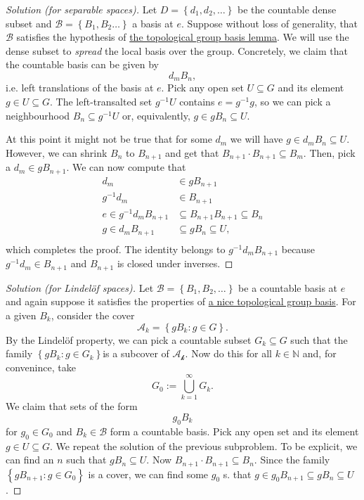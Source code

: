 \begin{proof}[Solution (for separable spaces)]
    Let \( D = \left\{ d_1, d_2, \ldots \right\} \) be the countable dense subset and \( \mathcal{B} = \left\{ B_1, B_2 \ldots \right\} \) a basis at \( e \). Suppose without loss of generality, that \( \mathcal{B} \) satisfies the hypothesis of \hyperlink{TopGroupLocalBasis}{the topological group basis lemma}. We will use the dense subset to \emph{spread} the local basis over the group. Concretely, we claim that the countable basis can be given by
    \[ 
       d_m B_n,
   \]
   i.e. left translations of the basis at \( e \). Pick any open set \( U \subseteq G \) and its element \( g \in U \subseteq G \). The left-transalted set \( g^{-1}U \) contains \( e = g^{-1}g \), so we can pick a neighbourhood \( B_n \subseteq g^{-1}U \) or, equivalently, \( g \in gB_n \subseteq U \).

   At this point it might not be true that for some \( d_m \) we will have \( g \in d_mB_n \subseteq U \). However, we can shrink \( B_n \) to \( B_{n+1} \) and get that \( B_{n+1} \cdot B_{n+1} \subseteq B_m \). Then, pick a \( d_m \in gB_{n+1} \). We can now compute that
\begin{align*}
    d_m &\in gB_{n+1}  \\
    g^{-1}d_m &\in B_{n+1} \\
    e \in g^{-1}d_mB_{n+1} &\subseteq B_{n+1}B_{n+1}\subseteq B_n \\
    g \in d_mB_{n+1} &\subseteq gB_n \subseteq U, \\
\end{align*}
which completes the proof. The identity belongs to \( g^{-1}d_mB_{n+1} \) because \( g^{-1}d_m \in B_{n+1} \) and \( B_{n+1} \) is closed under inverses.
\end{proof}

\begin{proof}[Solution (for Lindel\"of spaces)]
    Let \( \mathcal{B} = \left\{ B_1, B_2, \ldots \right\} \) be a countable basis at \( e \) and again suppose it satisfies the properties of \hyperlink{TopGroupLocalBasis}{a nice topological group basis}. For a given \( B_k \), consider the cover
    \[ 
       \mathcal{A}_k = \left\{ gB_k : g \in G \right\}.
   \]
   By the Lindel\"of property, we can pick a countable subset \( G_k \subseteq G \) such that the family \( \left\{ gB_k : g \in G_k \right\} \)is a subcover of \( \mathcal{A_k} \). Now do this for all \( k \in \mathbb{N} \) and, for convenince, take
   \[ 
       G_0 := \bigcup_{k=1}^\infty G_k. 
  \]
  We claim that sets of the form
  \[ 
     g_0B_k 
 \]
 for \( g_0 \in G_0 \) and \( B_k \in \mathcal{B} \) form a countable basis. Pick any open set and its element \( g \in U \subseteq G \). We repeat the solution of the previous subproblem. To be explicit, we can find an \( n \) such that \( gB_n \subseteq U \). Now \( B_{n+1} \cdot B_{n+1} \subseteq B_{n} \). Since the family \( \left\{ gB_{n+1} : g \in G_0 \right\} \) is a cover, we can find some \( g_0 \) s. that \( g \in g_0B_{n+1} \subseteq gB_n \subseteq U \).
\end{proof}

